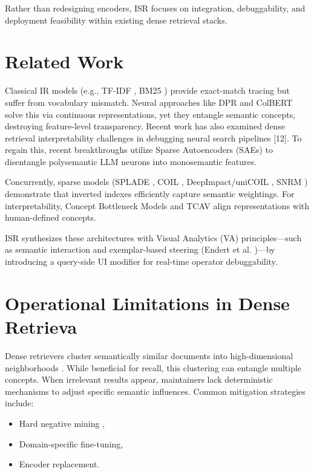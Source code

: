 \documentclass[sigconf,authordraft]{acmart}
\begin{document}
Rather than redesigning encoders, ISR focuses on integration, debuggability, and deployment feasibility within existing dense retrieval stacks.

\section{Related Work}
Classical IR models (e.g., TF-IDF \cite{croft2010}, BM25 \cite{robertson2009}) provide exact-match tracing but suffer from vocabulary mismatch. Neural approaches like DPR \cite{karpukhin2020} and ColBERT \cite{khattab2020} solve this via continuous representations, yet they entangle semantic concepts, destroying feature-level transparency. Recent work has also examined dense retrieval interpretability challenges in debugging neural search pipelines [12]. To regain this, recent breakthroughs utilize Sparse Autoencoders (SAEs) \cite{bricken2023, cunningham2024} to disentangle polysemantic LLM neurons into monosemantic features.

Concurrently, sparse models (SPLADE \cite{formal2021}, COIL \cite{lin2021_notes}, DeepImpact/uniCOIL \cite{lin2021_notes}, SNRM \cite{zamani2017}) demonstrate that inverted indexes efficiently capture semantic weightings. For interpretability, Concept Bottleneck Models and TCAV \cite{kim2018} align representations with human-defined concepts. 

ISR synthesizes these architectures with Visual Analytics (VA) principles—such as semantic interaction and exemplar-based steering (Endert et al. \cite{endert2018})—by introducing a query-side UI modifier for real-time operator debuggability.

\section{Operational Limitations in Dense Retrieva}
Dense retrievers cluster semantically similar documents into high-dimensional neighborhoods \cite{zhai2001}. While beneficial for recall, this clustering can entangle multiple concepts. When irrelevant results appear, maintainers lack deterministic mechanisms to adjust specific semantic influences. Common mitigation strategies include:

\begin{itemize}
    \item Hard negative mining \cite{karpukhin2020},
    \item Domain-specific fine-tuning,
    \item Encoder replacement.
\end{itemize}
\end{document}
